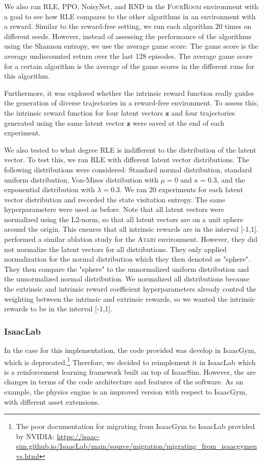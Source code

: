 \documentclass[10pt]{article} %
\begin{document}
We also ran RLE, PPO, NoisyNet, and RND in the \textsc{FourRoom} environment with a goal to see how RLE compares to the other algorithms in an environment with a reward. Similar to the reward-free setting, we run each algorithm 20 times on different seeds. However, instead of assessing the performance of the algorithms using the Shannon entropy, we use the average game score. The game score is the average undiscounted return over the last 128 episodes. The average game score for a certain algorithm is the average of the game scores in the different runs for this algorithm.

Furthermore, it was explored whether the intrinsic reward function really guides the generation of diverse trajectories in a reward-free environment. To assess this, the intrinsic reward function for four latent vectors $\textbf{z}$ and four trajectories generated using the same latent vector $\textbf{z}$ were saved at the end of each experiment. 

We also tested to what degree RLE is indifferent to the distribution of the latent vector. To test this, we ran RLE with different latent vector distributions. The following distributions were considered: Standard normal distribution, standard uniform distribution, Von-Mises distribution with $\mu=0$ and $\kappa=0.3$, and the exponential distribution with $\lambda=0.3$. We ran 20 experiments for each latent vector distribution and recorded the state visitation entropy. The same hyperparameters were used as before. Note that all latent vectors were normalized using the L2-norm, so that all latent vectors are on a unit sphere around the origin. This ensures that all intrinsic rewards are in the interval [-1,1]. \cite{rle-paper} performed a similar ablation study for the \textsc{Atari} environment. However, they did not normalize the latent vectors for all distributions. They only applied normalization for the normal distribution which they then denoted as "sphere". They then compare the "sphere" to the unnormalized uniform distribution and the unnormalized normal distribution. We normalized all distributions because the extrinsic and intrinsic reward coefficient hyperparameters already control the weighting between the intrinsic and extrinsic rewards, so we wanted the intrinsic rewards to be in the interval [-1,1].


\subsubsection{IsaacLab}
In the case for this implementation, the code provided was develop in IsaacGym, which is deprecated.\footnote{The poor documentation for migrating from IsaacGym to IsaacLab provided by NVIDIA: \url{https://isaac-sim.github.io/IsaacLab/main/source/migration/migrating_from_isaacgymenvs.html}} Therefore, we decided to reimplement it in IsaacLab which is a 
reinforcement learning framework built on top of IsaacSim. However, the are changes in terms of the code architecture and features of the software. As an example, 
the physics engine is an improved version with respect to IsaacGym, with different asset extensions.
\end{document}
